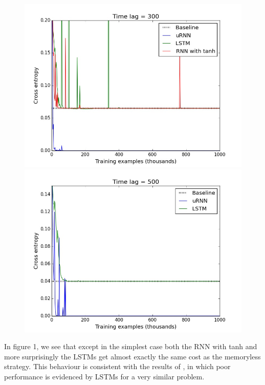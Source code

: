 \documentclass{article} %
\begin{document}
\begin{figure}[ht]
\begin{minipage}[b]{0.5\linewidth}
    \includegraphics[scale=0.25]{figures/memory_300.jpeg}
    \vspace{4ex}
    \end{minipage}%
  \begin{minipage}[b]{0.5\linewidth}
    \centering
    \includegraphics[scale=0.25]{figures/memory_500.jpeg}
    \vspace{4ex}
  \end{minipage} 
\end{figure}

In figure 1, we see that except in the simplest case both the RNN with tanh and more surprisingly the LSTMs get almost exactly the same cost as the memoryless strategy. This behaviour is consistent with the results of \cite{NTM}, in which poor performance is evidenced by LSTMs for a very similar problem.
\end{document}
